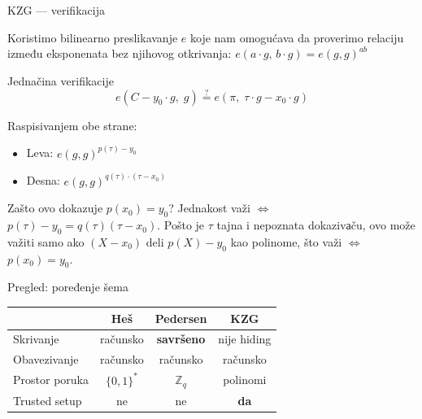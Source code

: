 \documentclass[aspectratio=1610]{beamer}
\newcommand{\keyword}[1]{\textcolor{wcprimary}{\textbf{#1}}}
\begin{document}
\begin{frame}{KZG — verifikacija}

Koristimo bilinearno preslikavanje $e$ koje nam omogućava da proverimo relaciju između eksponenata bez njihovog otkrivanja: $e(a \cdot g,\, b \cdot g) = e(g,g)^{ab}$


\begin{block}{Jednačina verifikacije}
  \[
    e(C - y_0 \cdot g,\; g) \stackrel{?}{=} e(\pi,\; \tau \cdot g - x_0 \cdot g)
  \]
\end{block}


Raspisivanjem obe strane:
\begin{itemize}
  
  \item Leva: $e(g,g)^{p(\tau) - y_0}$
  \item Desna: $e(g,g)^{q(\tau) \cdot (\tau - x_0)}$
\end{itemize}


\begin{exampleblock}{Zašto ovo dokazuje $p(x_0) = y_0$?}
Jednakost važi $\iff$ $p(\tau) - y_0 = q(\tau)(\tau - x_0)$.
Pošto je $\tau$ tajna i nepoznata dokazivаču, ovo može važiti samo ako
$(X - x_0)$ deli $p(X) - y_0$ kao polinome, što važi $\iff$ $p(x_0) = y_0$.
\end{exampleblock}
\end{frame}

\begin{frame}{Pregled: poređenje šema}

\begin{center}
\begin{tabular}{lccc}
  \toprule
  & \textbf{Heš} & \textbf{Pedersen} & \textbf{KZG} \\
  \midrule
  Skrivanje        & računsko            & \keyword{savršeno} & nije hiding \\
  Obavezivanje     & računsko            & računsko           & računsko \\
  Prostor poruka   & $\{0,1\}^*$         & $\mathbb{Z}_q$     & polinomi \\
  Trusted setup    & ne                  & ne                 & \keyword{da} \\
  
  \bottomrule
\end{tabular}
\end{center}
\end{frame}

\end{document}
